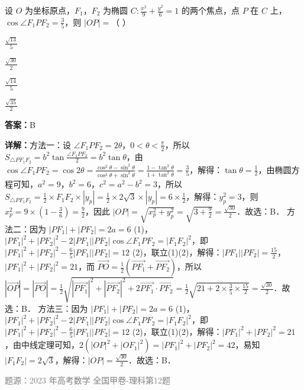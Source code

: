 \begin{question}
设 $O$ 为坐标原点，$F_1$，$F_2$ 为椭圆 $C: \frac{x^2}{9} + \frac{y^2}{6} = 1$ 的两个焦点，点 $P$ 在 $C$ 上，$\cos\angle F_1PF_2 = \frac{3}{5}$，则 $|OP| = $（         ）
\begin{choices}
\item $\frac{\sqrt{13}}{5}$
\item $\frac{\sqrt{30}}{2}$
\item $\frac{\sqrt{14}}{5}$
\item $\frac{\sqrt{35}}{2}$
\end{choices}
\begin{solution}
\textbf{答案：}B

\textbf{详解：}方法一：设 $\angle F_1PF_2 = 2\theta$，$0<\theta<\frac{\pi}{2}$，所以 $S_{\triangle PF_1F_2} = b^2\tan\frac{\angle F_1PF_2}{2} = b^2\tan\theta$，由 $\cos\angle F_1PF_2 = \cos2\theta = \frac{\cos^2\theta-\sin^2\theta}{\cos^2\theta+\sin^2\theta} = \frac{1-\tan^2\theta}{1+\tan^2\theta} = \frac{3}{5}$，解得：$\tan\theta = \frac{1}{2}$，由椭圆方程可知，$a^2=9$，$b^2=6$，$c^2=a^2-b^2=3$，所以 $S_{\triangle PF_1F_2} = \frac{1}{2}\times F_1F_2\times|y_p| = \frac{1}{2}\times2\sqrt{3}\times|y_p| = 6\times\frac{1}{2}$，解得：$y_p^2=3$，则 $x_p^2 = 9\times\left(1-\frac{3}{6}\right) = \frac{9}{2}$，因此 $|OP| = \sqrt{x_p^2+y_p^2} = \sqrt{3+\frac{9}{2}} = \frac{\sqrt{30}}{2}$．故选：B．
方法二：因为 $|PF_1|+|PF_2|=2a=6$ (1)，$|PF_1|^2+|PF_2|^2-2|PF_1||PF_2|\cos\angle F_1PF_2 = |F_1F_2|^2$，即 $|PF_1|^2+|PF_2|^2 - \frac{6}{5}|PF_1||PF_2| = 12$ (2)，联立(1)(2)，解得：$|PF_1||PF_2| = \frac{15}{2}$，$|PF_1|^2+|PF_2|^2 = 21$，而 $\overrightarrow{PO} = \frac{1}{2}(\overrightarrow{PF_1}+\overrightarrow{PF_2})$，所以 $|\overrightarrow{OP}| = |\overrightarrow{PO}| = \frac{1}{2}\sqrt{|\overrightarrow{PF_1}|^2+|\overrightarrow{PF_2}|^2+2\overrightarrow{PF_1}\cdot\overrightarrow{PF_2}} = \frac{1}{2}\sqrt{21+2\times\frac{3}{5}\times\frac{15}{2}} = \frac{\sqrt{30}}{2}$．故选：B．
方法三：因为 $|PF_1|+|PF_2|=2a=6$ (1)，$|PF_1|^2+|PF_2|^2-2|PF_1||PF_2|\cos\angle F_1PF_2 = |F_1F_2|^2$，即 $|PF_1|^2+|PF_2|^2 - \frac{6}{5}|PF_1||PF_2| = 12$ (2)，联立(1)(2)，解得：$|PF_1|^2+|PF_2|^2 = 21$，由中线定理可知，$2(|OP|^2+|OF_1|^2) = |PF_1|^2+|PF_2|^2 = 42$，易知 $|F_1F_2| = 2\sqrt{3}$，解得：$|OP| = \frac{\sqrt{30}}{2}$．故选：B．

\textcolor{gray}{\footnotesize 题源：2023 年高考数学 全国甲卷-理科第12题}
\end{solution}
\end{question}

